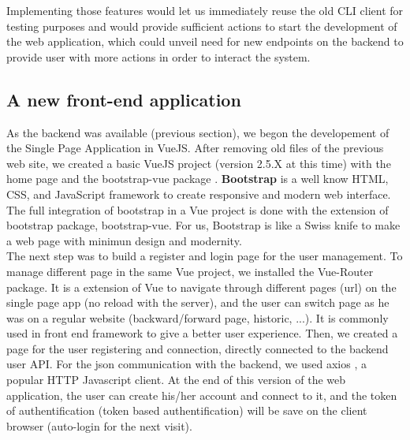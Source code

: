 \documentclass{eplmastersthesis}
\begin{document}
        Implementing those features would let us immediately reuse the old
        CLI client for testing purposes and would provide sufficient actions
        to start the development of the web application, which could unveil
        need for new endpoints on the backend to provide user with more
        actions in order to interact the system.\\


      \subsection{A new front-end application} %


        As the backend was available (previous section), we begon the
        developement of the Single Page Application in VueJS. After removing
        old files of the previous web site, we created a basic VueJS project
        (version 2.5.X at this time) with the home page and the bootstrap-vue
        package \cite{BootstrapVue}. \textbf{Bootstrap} \cite{Bootstrap} is a
        well know HTML, CSS, and JavaScript framework to create responsive and
        modern web interface. The full integration of bootstrap in a Vue
        project is done with the extension of bootstrap package, bootstrap-vue.
        For us, Bootstrap is like a Swiss knife to make a web page with minimun
        design and modernity. \\

        The next step was to build a register and login page for the user
        management. To manage different page in the same Vue project, we
        installed the Vue-Router package. It is a extension of Vue to navigate
        through different pages (url) on the single page app (no reload with
        the server), and the user can switch page as he was on a regular
        website (backward/forward page, historic, ...). It is commonly used in
        front end framework to give a better user experience. Then, we created
        a page for the user registering and connection, directly connected to
        the backend user API. For the json communication with the backend, we
        used axios \cite{axios}, a popular HTTP Javascript client. At the end
        of this version of the web application, the user can create his/her
        account and connect to it, and the token of authentification (token
        based authentification) will be save on the client browser (auto-login
        for the next visit). \\
\end{document}
